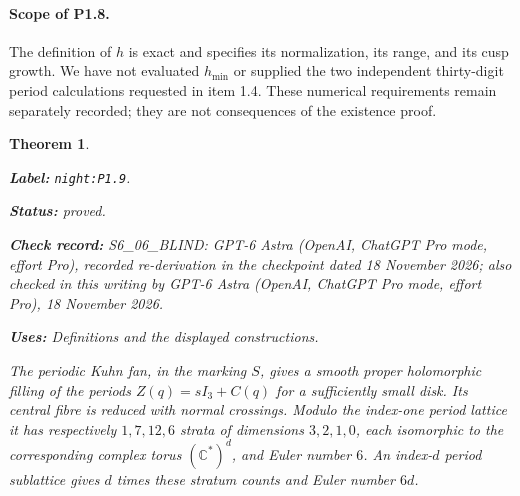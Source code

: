 \documentclass[11pt,a4paper]{article}
\newtheorem{theorem}{Theorem}[section]
\theoremstyle{definition}
\newcommand{\StatementRecord}[4]{\par\smallskip\begingroup\upshape\raggedright\noindent\textbf{Label:} \nolinkurl{#1}.\par\noindent\textbf{Status:} #2.\par\noindent\textbf{Check record:} #3.\par\noindent\textbf{Uses:} #4.\par\endgroup\smallskip}
\newcommand{\CurrentChecker}{GPT-6 Astra (OpenAI, ChatGPT Pro mode, effort Pro), 18 November 2026}
\begin{document}
\paragraph{Scope of P1.8.}
The definition of $h$ is exact and specifies its normalization, its
range, and its cusp growth.  We have not evaluated $h_{\min}$ or
supplied the two independent thirty-digit period calculations requested
in item 1.4.  These numerical requirements remain separately recorded;
they are not consequences of the existence proof.

\begin{theorem}\label{night:P1.9}
\StatementRecord{night:P1.9}{proved}{S6\_06\_BLIND: GPT-6 Astra (OpenAI, ChatGPT Pro mode, effort Pro), recorded re-derivation in the checkpoint dated 18 November 2026; also checked in this writing by \CurrentChecker}{Definitions and the displayed constructions}
The periodic Kuhn fan, in the marking $S$, gives a smooth proper
holomorphic filling of the periods $Z(q)=sI_3+C(q)$ for a sufficiently
small disk.  Its central fibre is reduced with normal crossings.
Modulo the index-one period lattice it has respectively $1,7,12,6$
strata of dimensions $3,2,1,0$, each isomorphic to the corresponding
complex torus $(\mathbb C^*)^d$, and Euler number $6$.
An index-$d$ period sublattice gives $d$ times these stratum counts and
Euler number $6d$.
\end{theorem}
\end{document}
